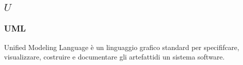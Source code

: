 \subsection*{\quad$U\quad$}
\subsubsection*{UML}
Unified Modeling Language è un linguaggio grafico standard per specififcare, visualizzare, costruire e documentare gli artefatti\glosp di un sistema software.

